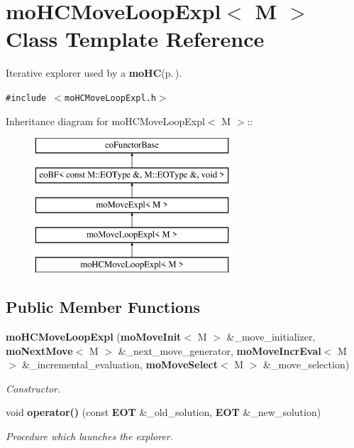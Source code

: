 \section{mo\-HCMove\-Loop\-Expl$<$ M $>$ Class Template Reference}
\label{classmo_h_c_move_loop_expl}
Iterative explorer used by a {\bf mo\-HC}{\rm (p.\,\pageref{classmo_h_c})}.  


{\tt \#include $<$mo\-HCMove\-Loop\-Expl.h$>$}

Inheritance diagram for mo\-HCMove\-Loop\-Expl$<$ M $>$::\begin{figure}[H]
\begin{center}
\leavevmode
\includegraphics[height=5cm]{classmo_h_c_move_loop_expl}
\end{center}
\end{figure}
\subsection*{Public Member Functions}
\begin{CompactItemize}
\item 
{\bf mo\-HCMove\-Loop\-Expl} ({\bf mo\-Move\-Init}$<$ M $>$ \&\_\-move\_\-initializer, {\bf mo\-Next\-Move}$<$ M $>$ \&\_\-next\_\-move\_\-generator, {\bf mo\-Move\-Incr\-Eval}$<$ M $>$ \&\_\-incremental\_\-evaluation, {\bf mo\-Move\-Select}$<$ M $>$ \&\_\-move\_\-selection)
\begin{CompactList}\small\item\em Constructor. \item\end{CompactList}\item 
void {\bf operator()} (const {\bf EOT} \&\_\-old\_\-solution, {\bf EOT} \&\_\-new\_\-solution)
\begin{CompactList}\small\item\em Procedure which launches the explorer. \item\end{CompactList}\end{CompactItemize}
